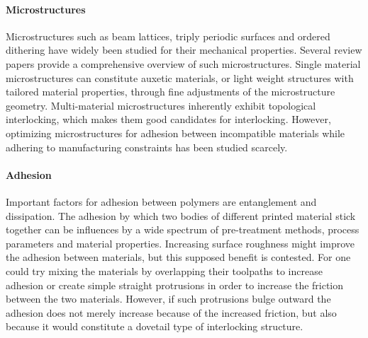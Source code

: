 \paragraph{Microstructures}
Microstructures such as beam lattices, triply periodic surfaces and ordered dithering have widely been studied for their mechanical properties.
Several review papers provide a comprehensive overview of such microstructures.\cite{Cadman2013,Zhang2018a,tamburrino2018}
Single material microstructures can constitute auxetic materials, %
or light weight structures with tailored material properties, through fine adjustments of the microstructure geometry. %
Multi-material microstructures inherently exhibit topological interlocking, which makes them good candidates for interlocking\cite{freund2019determination}.
However, optimizing microstructures for adhesion between incompatible materials while adhering to  manufacturing constraints has been studied scarcely.



\paragraph{Adhesion}

Important factors for adhesion between polymers are entanglement and dissipation\cite{abbott2015adhesion}.
The adhesion by which two bodies of different  printed material stick together can be influences by a wide spectrum of pre-treatment methods, process parameters and material properties\cite{freund2019determination}.
Increasing surface roughness might improve the adhesion between materials\cite{huttenbach1991interface,gent1990model}, but this supposed benefit is contested\cite{abbott2015adhesion}.
For  one could try mixing the materials by overlapping their toolpaths to increase adhesion or create simple straight protrusions in order to increase the friction between the two materials\cite{tamburrino19}.
However, if such protrusions bulge outward the adhesion does not merely increase because of the increased friction, but also because it would constitute a dovetail type of interlocking structure.



